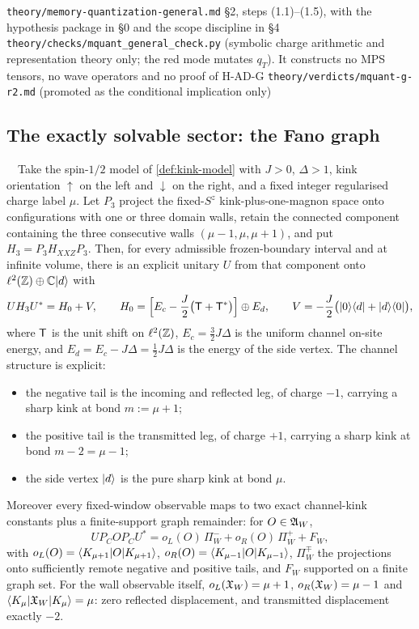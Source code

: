 %
{\texttt{theory/memory-quantization-general.md} \S2, steps (1.1)--(1.5), with
 the hypothesis package in \S0 and the scope discipline in \S4}%
{\texttt{theory/checks/mquant\_general\_check.py} (symbolic charge arithmetic
 and representation theory only; the red mode mutates $q_T$). It constructs no
 MPS tensors, no wave operators and no proof of H-AD-G}%
{\texttt{theory/verdicts/mquant-g-r2.md} (promoted as the conditional
 implication only)}

\subsection{The exactly solvable sector: the Fano graph}

\begin{theorem}
\label{thm:Mq-E}
\statusProved\ \ Take the spin-$1/2$ model of \cref{def:kink-model} with $J>0$,
$\Delta>1$, kink orientation $\uparrow$ on the left and $\downarrow$ on the
right, and a fixed integer regularised charge label $\mu$. Let $P_3$ project
the fixed-$S^z$ kink-plus-one-magnon space onto configurations with one or
three domain walls, retain the connected component containing the three
consecutive walls $(\mu-1,\mu,\mu+1)$, and put $H_3=P_3H_{XXZ}P_3$. Then, for
every admissible frozen-boundary interval and at infinite volume, there is an
explicit unitary $U$ from that component onto
$\ell^2(\mathbb{Z})\oplus\mathbb{C}|d\rangle$ with
\begin{equation}
  UH_3U^*=H_0+V,\qquad
  H_0=\Bigl[E_c-\frac{J}{2}\bigl(\mathsf{T}+\mathsf{T}^*\bigr)\Bigr]\oplus E_d,
  \qquad
  V=-\frac{J}{2}\bigl(|0\rangle\langle d|+|d\rangle\langle 0|\bigr),
  \label{eq:fano}
\end{equation}
where $\mathsf{T}$ is the unit shift on $\ell^2(\mathbb{Z})$,
$E_c=\tfrac{3}{2}J\Delta$ is the uniform channel on-site energy, and
$E_d=E_c-J\Delta=\tfrac12 J\Delta$ is the energy of the side vertex. The
channel structure is explicit:
\begin{itemize}
\item the negative tail is the incoming and reflected leg, of charge $-1$,
  carrying a sharp kink at bond $m:=\mu+1$;
\item the positive tail is the transmitted leg, of charge $+1$, carrying a
  sharp kink at bond $m-2=\mu-1$;
\item the side vertex $|d\rangle$ is the pure sharp kink at bond $\mu$.
\end{itemize}
Moreover every fixed-window observable maps to two exact channel-kink constants
plus a finite-support graph remainder: for $O\in\mathfrak{A}_W$,
\begin{equation}
  U P_C O P_C U^*
  =o_L(O)\,\Pi^-_W+o_R(O)\,\Pi^+_W+F_W,
  \label{eq:local-obs-map}
\end{equation}
with $o_L(O)=\langle K_{\mu+1}|O|K_{\mu+1}\rangle$,
$o_R(O)=\langle K_{\mu-1}|O|K_{\mu-1}\rangle$, $\Pi^\mp_W$ the projections onto
sufficiently remote negative and positive tails, and $F_W$ supported on a finite
graph set. For the wall observable itself, $o_L(\mathfrak{X}_W)=\mu+1$,
$o_R(\mathfrak{X}_W)=\mu-1$ and $\langle K_\mu|\mathfrak{X}_W|K_\mu\rangle=\mu$: zero reflected
displacement, and transmitted displacement exactly $-2$.
\end{theorem}

